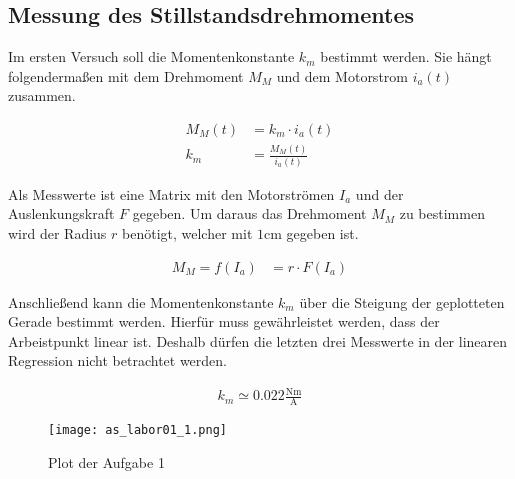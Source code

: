 \subsection{Messung des Stillstandsdrehmomentes}

Im ersten Versuch soll die Momentenkonstante $k_m$ bestimmt werden.
Sie hängt folgendermaßen mit dem Drehmoment $M_M$ und dem Motorstrom $i_a(t)$
zusammen. 

\begin{equation} \label{eq111}
    \begin{split}
        M_M(t)&=k_m \cdot i_a(t)\\
        k_m&=\frac{M_M(t)}{i_a(t)}
    \end{split}
\end{equation}

Als Messwerte ist eine Matrix mit den Motorströmen $I_a$ und der Auslenkungskraft $F$
gegeben. Um daraus das Drehmoment $M_M$ zu bestimmen wird der Radius $r$ benötigt,
welcher mit $1 \mathrm{cm}$ gegeben ist.

\begin{equation} \label{eq112}
    \begin{split}
        M_M=f(I_a)&=r \cdot F(I_a)
    \end{split}
\end{equation}

Anschließend kann die Momentenkonstante $k_m$ über die Steigung der geplotteten
Gerade bestimmt werden. Hierfür muss gewährleistet werden, dass der Arbeistpunkt
linear ist. Deshalb dürfen die letzten drei Messwerte in der linearen Regression
nicht betrachtet werden.

\begin{equation} \label{eq113}
    \begin{split}
        k_m\simeq 0.022 \mathrm{\frac{Nm}{A}}
    \end{split}
\end{equation}

\begin{figure}[H]
 \centering
 \texttt{[image: as\_labor01\_1.png]}
 \caption{Plot der Aufgabe 1}
 \label{fig:PlotAufgabe1}
\end{figure}